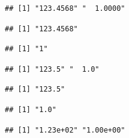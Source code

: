 \documentclass[krantz2]{krantz}\usepackage{knitr}%
\begin{document}
\begin{knitrout}\footnotesize
{}\color{fgcolor}\begin{kframe}
\begin{alltt}
 \hlkwb{=} \hlstd{(}\hlstd{,} \hlstd{)}
 
\end{alltt}
\begin{verbatim}
## [1] "123.4568" "  1.0000"
\end{verbatim}
\begin{alltt}
\hlstd{(x[}\hlstd{])} 
\end{alltt}
\begin{verbatim}
## [1] "123.4568"
\end{verbatim}
\begin{alltt}
\hlstd{(x[}\hlstd{])} 
\end{alltt}
\begin{verbatim}
## [1] "1"
\end{verbatim}
\begin{alltt}
  \hlstd{=} \hlstd{,}  \hlstd{=} \hlstd{)}
\end{alltt}
\begin{verbatim}
## [1] "123.5" "  1.0"
\end{verbatim}
\begin{alltt}
\hlstd{(x[}\hlstd{],}  \hlstd{=} \hlstd{,}  \hlstd{=} \hlstd{)}
\end{alltt}
\begin{verbatim}
## [1] "123.5"
\end{verbatim}
\begin{alltt}
\hlstd{(x[}\hlstd{],}  \hlstd{=} \hlstd{,}  \hlstd{=} \hlstd{)}
\end{alltt}
\begin{verbatim}
## [1] "1.0"
\end{verbatim}
\begin{alltt}
  \hlstd{=} \hlstd{,}  \hlstd{=} \hlstd{)}
\end{alltt}
\begin{verbatim}
## [1] "1.23e+02" "1.00e+00"
\end{verbatim}
\end{kframe}
\end{knitrout}
\end{document}
